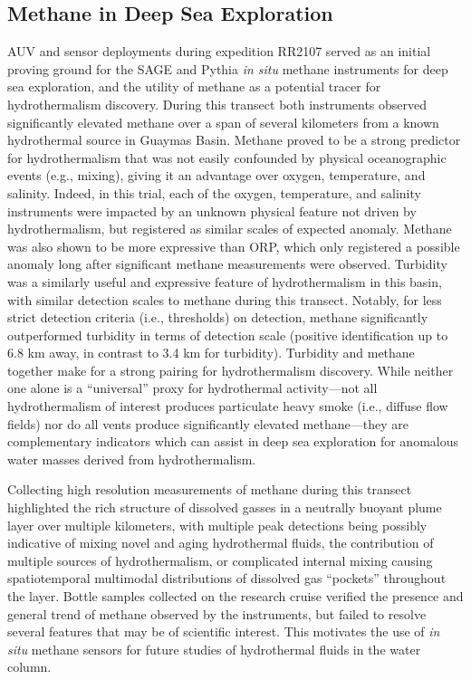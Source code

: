 \subsection{Methane in Deep Sea Exploration}
AUV and sensor deployments during expedition RR2107 served as an initial proving ground for the SAGE and Pythia \emph{in situ} methane instruments for deep sea exploration, and the utility of methane as a potential tracer for hydrothermalism discovery. During this transect both instruments observed significantly elevated methane over a span of several kilometers from a known hydrothermal source in Guaymas Basin. Methane proved to be a strong predictor for hydrothermalism that was not easily confounded by physical oceanographic events (e.g., mixing), giving it an advantage over oxygen, temperature, and salinity. Indeed, in this trial, each of the oxygen, temperature, and salinity instruments were impacted by an unknown physical feature not driven by hydrothermalism, but registered as similar scales of expected anomaly. Methane was also shown to be more expressive than ORP, which only registered a possible anomaly long after significant methane measurements were observed. Turbidity was a similarly useful and expressive feature of hydrothermalism in this basin, with similar detection scales to methane during this transect. Notably, for less strict detection criteria (i.e., thresholds) on detection, methane significantly outperformed turbidity in terms of detection scale (positive identification up to 6.8 km away, in contrast to 3.4 km for turbidity). Turbidity and methane together make for a strong pairing for hydrothermalism discovery. While neither one alone is a ``universal'' proxy for hydrothermal activity---not all hydrothermalism of interest produces particulate heavy smoke (i.e., diffuse flow fields) nor do all vents produce significantly elevated methane---they are complementary indicators which can assist in deep sea exploration for anomalous water masses derived from hydrothermalism. 

Collecting high resolution measurements of methane during this transect highlighted the rich structure of dissolved gasses in a neutrally buoyant plume layer over multiple kilometers, with multiple peak detections being possibly indicative of mixing novel and aging hydrothermal fluids, the contribution of multiple sources of hydrothermalism, or complicated internal mixing causing spatiotemporal multimodal distributions of dissolved gas ``pockets'' throughout the layer. Bottle samples collected on the research cruise verified the presence and general trend of methane observed by the instruments, but failed to resolve several features that may be of scientific interest. This motivates the use of \emph{in situ} methane sensors for future studies of hydrothermal fluids in the water column. 


